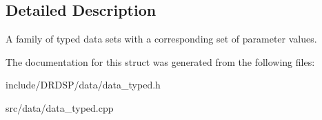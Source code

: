 \subsection{Detailed Description}
A family of typed data sets with a corresponding set of parameter values. 

The documentation for this struct was generated from the following files\-:\begin{DoxyCompactItemize}
\item 
include/\-D\-R\-D\-S\-P/data/data\-\_\-typed.\-h\item 
src/data/data\-\_\-typed.\-cpp\end{DoxyCompactItemize}
